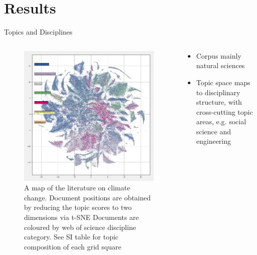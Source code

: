 \documentclass[9pt]{beamer}
\begin{document}
\section{Results}


\begin{frame}{Topics and Disciplines}
\begin{columns}
	\begin{column}{0.618\linewidth}
		\begin{figure}
			\begin{center}
				\includegraphics[width=0.8\linewidth]{../tsne_results/plots/run_1429_s_0_p50_oecds.png}
				\caption{A map of the literature on climate change. Document positions are obtained by reducing the topic scores to two dimensions via t-SNE Documents are coloured by web of science discipline category. See SI table for topic composition of each grid square}
				\label{map-oecd}
			\end{center}
		\end{figure}
	\end{column}
	\begin{column}{0.382\linewidth}
		\begin{itemize}
			\item<2-> Corpus mainly natural sciences
			\item<3-> Topic space maps to disciplinary structure, with cross-cutting topic areas, e.g. social science and engineering
			
		\end{itemize}
	\end{column}
\end{columns}
\end{frame}
\end{document}
